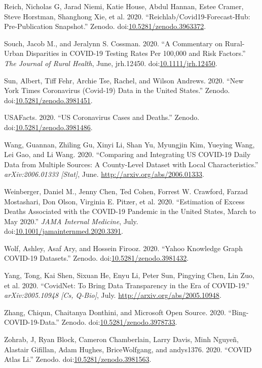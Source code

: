 \documentclass[10pt,letterpaper]{article}
\begin{document}
\hypertarget{ref-nicholasgreichReichlabCovid19forecasthubPrepublication2020}{}
Reich, Nicholas G, Jarad Niemi, Katie House, Abdul Hannan, Estee Cramer,
Steve Horstman, Shanghong Xie, et al. 2020.
``Reichlab/Covid19-Forecast-Hub: Pre-Publication Snapshot.'' Zenodo.
doi:\href{https://doi.org/10.5281/zenodo.3963372}{10.5281/zenodo.3963372}.

\hypertarget{ref-souchCommentaryRuralUrban2020}{}
Souch, Jacob M., and Jeralynn S. Cossman. 2020. ``A Commentary on
Rural-Urban Disparities in COVID-19 Testing Rates Per 100,000 and Risk
Factors.'' \emph{The Journal of Rural Health}, June, jrh.12450.
doi:\href{https://doi.org/10.1111/jrh.12450}{10.1111/jrh.12450}.

\hypertarget{ref-albertsunNewYorkTimes2020}{}
Sun, Albert, Tiff Fehr, Archie Tse, Rachel, and Wilson Andrews. 2020.
``New York Times Coronavirus (Covid-19) Data in the United States.''
Zenodo.
doi:\href{https://doi.org/10.5281/zenodo.3981451}{10.5281/zenodo.3981451}.

\hypertarget{ref-usafactsUSCoronavirusCases2020}{}
USAFacts. 2020. ``US Coronavirus Cases and Deaths.'' Zenodo.
doi:\href{https://doi.org/10.5281/zenodo.3981486}{10.5281/zenodo.3981486}.

\hypertarget{ref-wangComparingIntegratingUS2020}{}
Wang, Guannan, Zhiling Gu, Xinyi Li, Shan Yu, Myungjin Kim, Yueying
Wang, Lei Gao, and Li Wang. 2020. ``Comparing and Integrating US
COVID-19 Daily Data from Multiple Sources: A County-Level Dataset with
Local Characteristics.'' \emph{arXiv:2006.01333 {[}Stat{]}}, June.
\url{http://arxiv.org/abs/2006.01333}.

\hypertarget{ref-weinbergerEstimationExcessDeaths2020}{}
Weinberger, Daniel M., Jenny Chen, Ted Cohen, Forrest W. Crawford,
Farzad Mostashari, Don Olson, Virginia E. Pitzer, et al. 2020.
``Estimation of Excess Deaths Associated with the COVID-19 Pandemic in
the United States, March to May 2020.'' \emph{JAMA Internal Medicine},
July.
doi:\href{https://doi.org/10.1001/jamainternmed.2020.3391}{10.1001/jamainternmed.2020.3391}.

\hypertarget{ref-ashleywolfYahooKnowledgeGraph2020}{}
Wolf, Ashley, Asaf Ary, and Hossein Firooz. 2020. ``Yahoo Knowledge
Graph COVID-19 Datasets.'' Zenodo.
doi:\href{https://doi.org/10.5281/zenodo.3981432}{10.5281/zenodo.3981432}.

\hypertarget{ref-yangCovidNetBringData2020}{}
Yang, Tong, Kai Shen, Sixuan He, Enyu Li, Peter Sun, Pingying Chen, Lin
Zuo, et al. 2020. ``CovidNet: To Bring Data Transparency in the Era of
COVID-19.'' \emph{arXiv:2005.10948 {[}Cs, Q-Bio{]}}, July.
\url{http://arxiv.org/abs/2005.10948}.

\hypertarget{ref-chiqunzhangBingCOVID19Data2020}{}
Zhang, Chiqun, Chaitanya Donthini, and Microsoft Open Source. 2020.
``Bing-COVID-19-Data.'' Zenodo.
doi:\href{https://doi.org/10.5281/zenodo.3978733}{10.5281/zenodo.3978733}.

\hypertarget{ref-jzohrabCOVIDAtlasLi2020}{}
Zohrab, J, Ryan Block, Cameron Chamberlain, Larry Davis, Minh Nguyeñ,
Alastair Gifillan, Adam Hughes, BriceWolfgang, and andys1376. 2020.
``COVID Atlas Li.'' Zenodo.
doi:\href{https://doi.org/10.5281/zenodo.3981563}{10.5281/zenodo.3981563}.

\nolinenumbers
\end{document}
